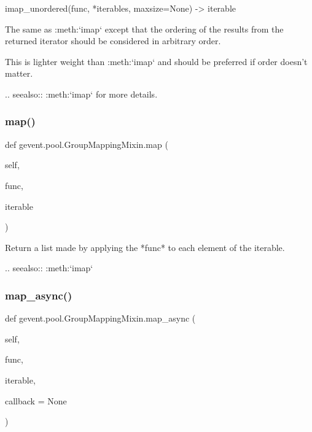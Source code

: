 \begin{DoxyVerb}imap_unordered(func, *iterables, maxsize=None) -> iterable

The same as :meth:`imap` except that the ordering of the results
from the returned iterator should be considered in arbitrary
order.

This is lighter weight than :meth:`imap` and should be preferred if order
doesn't matter.

.. seealso:: :meth:`imap` for more details.
\end{DoxyVerb}
 \mbox{\label{classgevent_1_1pool_1_1_group_mapping_mixin_ab98092e4962dda9badad51318f2a2112}} 
\subsubsection{\texorpdfstring{map()}{map()}}
{\footnotesize\ttfamily def gevent.\+pool.\+Group\+Mapping\+Mixin.\+map (\begin{DoxyParamCaption}\item[{}]{self,  }\item[{}]{func,  }\item[{}]{iterable }\end{DoxyParamCaption})}

\begin{DoxyVerb}Return a list made by applying the *func* to each element of
the iterable.

.. seealso:: :meth:`imap`
\end{DoxyVerb}
 \mbox{\label{classgevent_1_1pool_1_1_group_mapping_mixin_a911ffc786f9671500b344a461d4527ba}} 
\subsubsection{\texorpdfstring{map\+\_\+async()}{map\_async()}}
{\footnotesize\ttfamily def gevent.\+pool.\+Group\+Mapping\+Mixin.\+map\+\_\+async (\begin{DoxyParamCaption}\item[{}]{self,  }\item[{}]{func,  }\item[{}]{iterable,  }\item[{}]{callback = {\ttfamily None} }\end{DoxyParamCaption})}

